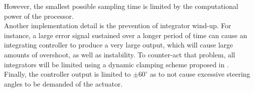 However, the smallest possible sampling time is limited by the computational power of the processor. \\

Another implementation detail is the prevention of integrator wind-up. For instance, a large error signal sustained over a longer period of time can cause an integrating controller to produce a very large output, which will cause large amounts of overshoot, as well as instability. To counter-act that problem, all integrators will be limited using a dynamic clamping scheme proposed in \cite{antiwindup}. \\

Finally, the controller output is limited to $\pm 60^{\circ}$ as to not cause excessive steering angles to be demanded of the actuator.